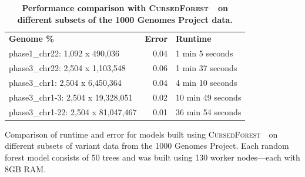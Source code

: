 \documentclass[10pt,letterpaper]{article}
\newlength\savedwidth
\newcommand\thickhline{\noalign{\global\savedwidth\arrayrulewidth\global\arrayrulewidth 2pt}%
\hline
\noalign{\global\arrayrulewidth\savedwidth}}
\newcommand{\cursedforest}{\textsc{CursedForest}\ }
\begin{document}
\begin{table}[!ht]
\begin{minipage}{\textwidth}
\centering
\caption{ {\bf Performance comparison with \cursedforest\ on different subsets of the 1000 Genomes Project data.}}
\begin{tabular}{| l | r | l |}
\hline
{\bf Genome \%} & {\bf Error} & {\bf Runtime} \\ \thickhline
phase1\_chr22: 1,092 x 490,036 & 0.04 & 1 min 5 seconds \\ \hline
phase3\_chr22: 2,504 x 1,103,548 & 0.06 & 1 min 37 seconds \\ \hline
phase3\_chr1: 2,504 x 6,450,364 & 0.04 & 4 min 10 seconds \\ \hline
phase3\_chr1-3: 2,504 x 19,328,051 & 0.02 & 10 min 49 seconds \\ \hline
phase3\_chr1-22: 2,504 x 81,047,467 & 0.01 & 36 min 54 seconds \\ \hline
\end{tabular}
\begin{flushleft} 
Comparison of runtime and error for models built using \cursedforest\ on different subsets of variant data 
from the 1000 Genomes Project.
Each random forest model consists of 50 trees and was built using 130 worker nodes---each with 8GB RAM.
\end{flushleft}
\label{cursedforesttable}
\end{minipage}
\end{table}
\end{document}
